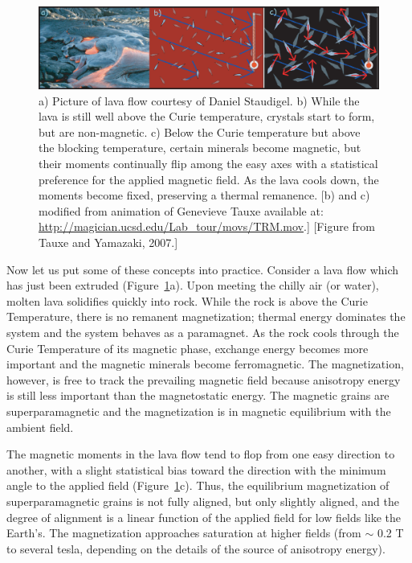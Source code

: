 \begin{figure}[h!tb]
\centering  \includegraphics[width=14 cm]{EPSfiles/lava.eps}
\caption{a) 
Picture of lava flow courtesy of Daniel Staudigel.  b) While the lava is still well above the Curie temperature, crystals start to form, but are non-magnetic.  c) Below the Curie temperature but above the blocking temperature,  certain minerals become magnetic, but their moments continually flip among the easy axes with a statistical preference for the applied magnetic field.  As the lava cools down, the moments become fixed, preserving a thermal remanence.  [b) and c) modified from animation of Genevieve Tauxe available at:  \newline \href{http://magician.ucsd.edu/Lab_tour/movs/TRM.mov}{http://magician.ucsd.edu/Lab_tour/movs/TRM.mov}.] [Figure from Tauxe and Yamazaki, 2007.]
 }
\label{fig:lava}
\end{figure}


Now let us put some of these concepts into practice.  
Consider a lava flow which has just been extruded (Figure~\ref{fig:lava}a).
Upon meeting the chilly air (or water),  molten lava  solidifies quickly into rock.  While the rock is above the 
Curie
Temperature,  there is no  remanent magnetization; 
thermal energy dominates the
system and the system behaves as a paramagnet.  As the rock cools through the Curie Temperature of its magnetic phase,
exchange energy becomes more important and the magnetic minerals  become ferromagnetic.    The magnetization, however, is free to track the
prevailing magnetic field  because 
anisotropy energy is still  less important
than the magnetostatic energy.  The magnetic grains are  
superparamagnetic and the magnetization is in 
magnetic equilibrium with the ambient field.


The magnetic moments in the lava flow  tend to flop from one  easy
direction to another,
with a slight statistical bias toward the direction with 
the minimum angle to the applied field (Figure~\ref{fig:lava}c).  Thus, the 
equilibrium magnetization of superparamagnetic grains is not fully
aligned,   but only slightly aligned, and the degree of alignment is a linear function of the applied field for low fields like the Earth's.  The magnetization approaches saturation at higher
fields (from $\sim$ 0.2 T to several tesla, depending on the details of
the source of anisotropy energy).  



